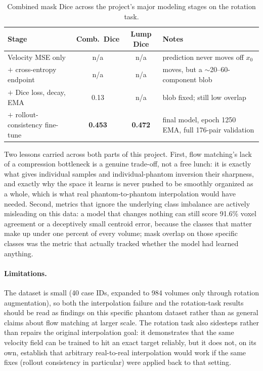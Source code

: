 \documentclass[11pt]{article}
\begin{document}
\begin{table}[H]
\centering
\small
\begin{tabular}{@{}p{5.0cm}ccp{4.6cm}@{}}
\toprule
Stage & Comb.\ Dice & Lump Dice & Notes \\
\midrule
Velocity MSE only & n/a & n/a & prediction never moves off $x_0$ \\
$+$ cross-entropy endpoint & n/a & n/a & moves, but a $\sim$20--60-component blob \\
$+$ Dice loss, decay, EMA & 0.13 & n/a & blob fixed; still low overlap \\
$+$ rollout-consistency fine-tune & \textbf{0.453} & \textbf{0.472} & final model, epoch 1250 EMA, full 176-pair validation \\
\bottomrule
\end{tabular}
\caption{Combined mask Dice across the project's major modeling stages on the rotation task.}
\label{tab:milestones}
\end{table}

Two lessons carried across both parts of this project. First, flow matching's lack of a
compression bottleneck is a genuine trade-off, not a free lunch: it is exactly what gives
individual samples and individual-phantom inversion their sharpness, and exactly why the space
it learns is never pushed to be smoothly organized as a whole, which is what real
phantom-to-phantom interpolation would have needed. Second, metrics that ignore the underlying
class imbalance are actively misleading on this data: a model that changes nothing can still
score 91.6\% voxel agreement or a deceptively small centroid error, because the classes that
matter make up under one percent of every volume; mask overlap on those specific classes was the
metric that actually tracked whether the model had learned anything.

\paragraph{Limitations.} The dataset is small (40 case IDs, expanded to 984 volumes only through
rotation augmentation), so both the interpolation failure and the rotation-task results should
be read as findings on this specific phantom dataset rather than as general claims about flow
matching at larger scale. The rotation task also sidesteps rather than repairs the original
interpolation goal: it demonstrates that the same velocity field can be trained to hit an exact
target reliably, but it does not, on its own, establish that arbitrary real-to-real interpolation
would work if the same fixes (rollout consistency in particular) were applied back to that
setting.
\end{document}
